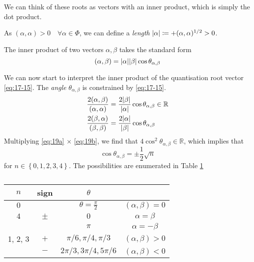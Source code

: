 \begin{wrapfigure}{R}{0.3\columnwidth}
  \centering
  \def\svgwidth{0.25\columnwidth}
  
  \caption{}
  \label{fig:l18f1}
\end{wrapfigure}

We can think of these roots as vectors with an inner product, which is simply the dot product.
\begin{definition}[]
  As $(\alpha, \alpha) > 0 \quad \forall \alpha \in \Phi$, we can define a \emph{length} $\abs{\alpha} \coloneqq + (\alpha, \alpha)^{1 / 2} > 0$.
\end{definition}
The inner product of two vectors $\alpha, \beta$ takes the standard form
\begin{equation}
  (\alpha, \beta) = \abs{\alpha} \abs{\beta} \cos\theta_{\alpha, \beta}
\end{equation}

We can now start to interpret the inner product of the quantisation root vector \eqref{eq:17-15}.
The \emph{angle} $\theta_{\alpha, \beta}$ is constrained by \eqref{eq:17-15}.
\begin{subequations}
  \begin{align}
    \frac{2 (\alpha, \beta)}{(\alpha, \alpha)} &= \frac{2 \abs{\beta}}{\abs{ \alpha}} \cos \theta_{\alpha, \beta} \in \mathbb{R} \label{eq:19a} \\
    \frac{2 (\beta , \alpha)}{(\beta, \beta)} &= \frac{2 \abs{\alpha}}{\abs{\beta}} \cos \theta_{\alpha, \beta} \label{eq:19b}
  \end{align}
\end{subequations}
Multiplying \eqref{eq:19a} $\times$ \eqref{eq:19b}, we find that $4 \cos^2 \theta_{\alpha, \beta} \in \mathbb{R}$, which implies that
\begin{equation}
  \cos\theta_{\alpha, \beta} = \pm \frac{1}{2} \sqrt{n}
\end{equation}
for $n \in \left\{ 0, 1, 2, 3, 4 \right\}$.
The possibilities are enumerated in Table \ref{tab:18-1}
\begin{table}[btp]
  \centering
  \begin{tabular}{|c|c|c|c|}
    \hline
    $n$ & sign & $\theta$ &  \\
    \hline
    $0$ &  & $\theta = \frac{\pi}{2}$ & $(\alpha, \beta) = 0$ \\
    $4$ & $\pm$ & $0$ & $\alpha = \beta$ \\
	&  & $\pi$ & $\alpha = -\beta$ \\
    1, 2, 3 & $+$ & $\pi / 6, \pi/4, \pi/3$ & $(\alpha, \beta) > 0$ \\
	    & $-$ & $2\pi/3, 3 \pi/4, 5 \pi / 6$ & $(\alpha, \beta) <0$ \\
    \hline
  \end{tabular}
  \caption{}
  \label{tab:18-1}
\end{table}

